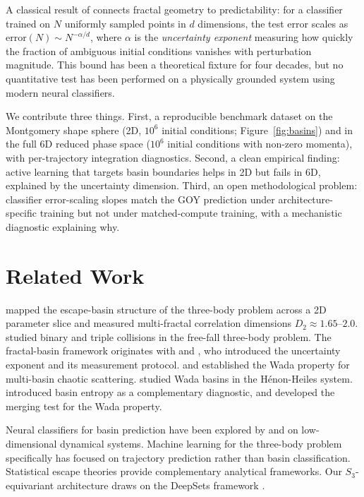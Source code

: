 \documentclass[10pt]{article}
\begin{document}
A classical result of \citet{GOY1983} connects fractal geometry to predictability: for a classifier trained on $N$ uniformly sampled points in $d$ dimensions, the test error scales as $\text{error}(N) \sim N^{-\alpha/d}$, where $\alpha$ is the \emph{uncertainty exponent} measuring how quickly the fraction of ambiguous initial conditions vanishes with perturbation magnitude. This bound has been a theoretical fixture for four decades, but no quantitative test has been performed on a physically grounded system using modern neural classifiers.

We contribute three things. First, a reproducible benchmark dataset on the Montgomery shape sphere \citep{Montgomery2015} (2D, $10^6$ initial conditions; Figure~\ref{fig:basins}) and in the full 6D reduced phase space ($10^6$ initial conditions with non-zero momenta), with per-trajectory integration diagnostics. Second, a clean empirical finding: active learning that targets basin boundaries helps in 2D but fails in 6D, explained by the uncertainty dimension. Third, an open methodological problem: classifier error-scaling slopes match the GOY prediction under architecture-specific training but not under matched-compute training, with a mechanistic diagnostic explaining why.

\section{Related Work}

\citet{Trani2024} mapped the escape-basin structure of the three-body problem across a 2D parameter slice and measured multi-fractal correlation dimensions $D_2 \approx 1.65$--$2.0$. \citet{UmeharaTanikawa1998} studied binary and triple collisions in the free-fall three-body problem. The fractal-basin framework originates with \citet{GOY1983} and \citet{MGOY1985}, who introduced the uncertainty exponent and its measurement protocol. \citet{NusseYorke1992} and \citet{Poon1996} established the Wada property for multi-basin chaotic scattering. \citet{Aguirre2001} studied Wada basins in the H\'enon-Heiles system. \citet{Daza2016} introduced basin entropy as a complementary diagnostic, and \citet{Daza2018} developed the merging test for the Wada property.

Neural classifiers for basin prediction have been explored by \citet{Shena2021} and \citet{Valle2024} on low-dimensional dynamical systems. Machine learning for the three-body problem specifically has focused on trajectory prediction \citep{Breen2020, Liao2022} rather than basin classification. Statistical escape theories \citep{StoneLeigh2019, Manwadkar2021, Kol2021} provide complementary analytical frameworks. Our $S_3$-equivariant architecture draws on the DeepSets framework \citep{DeepSets2017}.
\end{document}
